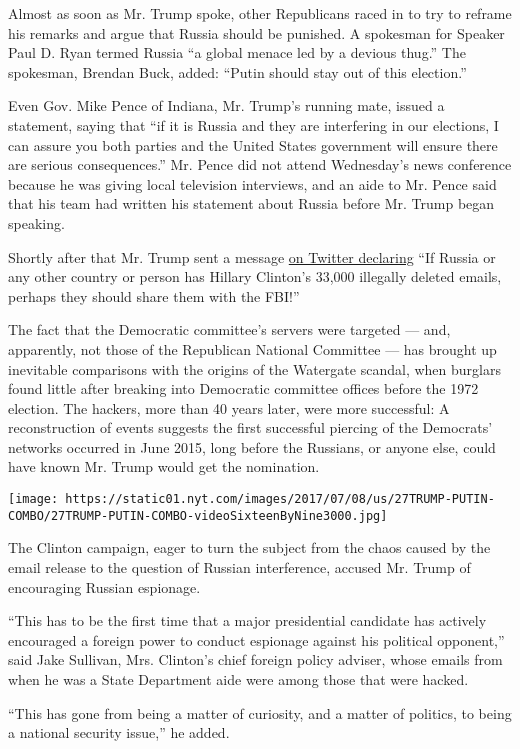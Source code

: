 Almost as soon as Mr. Trump spoke, other Republicans raced in to try to
reframe his remarks and argue that Russia should be punished. A
spokesman for Speaker Paul D. Ryan termed Russia ``a global menace led
by a devious thug.'' The spokesman, Brendan Buck, added: ``Putin should
stay out of this election.''

Even Gov. Mike Pence of Indiana, Mr. Trump's running mate, issued a
statement, saying that ``if it is Russia and they are interfering in our
elections, I can assure you both parties and the United States
government will ensure there are serious consequences.'' Mr. Pence did
not attend Wednesday's news conference because he was giving local
television interviews, and an aide to Mr. Pence said that his team had
written his statement about Russia before Mr. Trump began speaking.

Shortly after that Mr. Trump sent a message
\href{https://twitter.com/realDonaldTrump/status/758335147183788032}{on
Twitter declaring} ``If Russia or any other country or person has
Hillary Clinton's 33,000 illegally deleted emails, perhaps they should
share them with the FBI!''

The fact that the Democratic committee's servers were targeted --- and,
apparently, not those of the Republican National Committee --- has
brought up inevitable comparisons with the origins of the Watergate
scandal, when burglars found little after breaking into Democratic
committee offices before the 1972 election. The hackers, more than 40
years later, were more successful: A reconstruction of events suggests
the first successful piercing of the Democrats' networks occurred in
June 2015, long before the Russians, or anyone else, could have known
Mr. Trump would get the nomination.

\texttt{[image: https://static01.nyt.com/images/2017/07/08/us/27TRUMP-PUTIN-COMBO/27TRUMP-PUTIN-COMBO-videoSixteenByNine3000.jpg]}

The Clinton campaign, eager to turn the subject from the chaos caused by
the email release to the question of Russian interference, accused Mr.
Trump of encouraging Russian espionage.

``This has to be the first time that a major presidential candidate has
actively encouraged a foreign power to conduct espionage against his
political opponent,'' said Jake Sullivan, Mrs. Clinton's chief foreign
policy adviser, whose emails from when he was a State Department aide
were among those that were hacked.

``This has gone from being a matter of curiosity, and a matter of
politics, to being a national security issue,'' he added.

